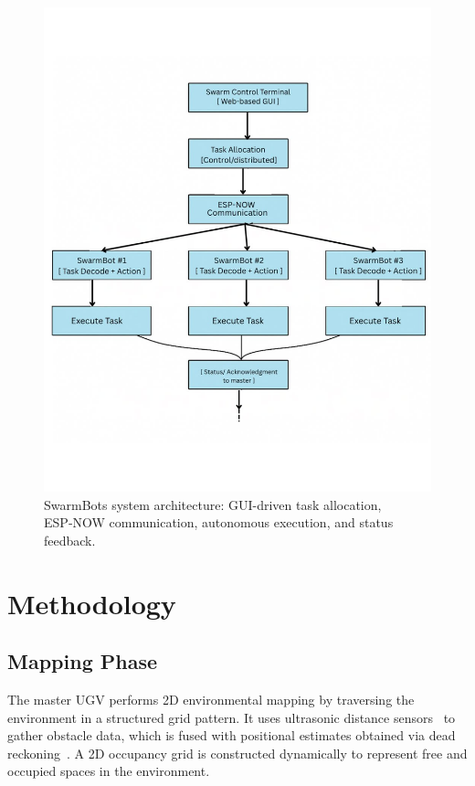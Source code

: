 \documentclass[conference]{IEEEtran}
\begin{document}
\begin{figure}[t]
    \centering
    \includegraphics[width=\columnwidth]{figs/Swarm Block.png}
\caption{SwarmBots system architecture: GUI-driven task allocation, ESP‑NOW communication, autonomous execution, and status feedback.}


  \label{fig:system-architecture}
\end{figure}

\section{Methodology}
\label{sec:Methodology}

\subsection{Mapping Phase}
The master UGV performs 2D environmental mapping by traversing the environment in a structured grid pattern. It uses ultrasonic distance sensors~\cite{arduino_hcsr04} to gather obstacle data, which is fused with positional estimates obtained via dead reckoning~\cite{kalra2005hoplite}. A 2D occupancy grid is constructed dynamically to represent free and occupied spaces in the environment.
\end{document}

